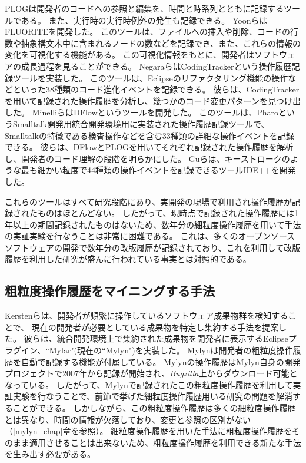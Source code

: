 \documentclass[a4paper]{jsbook}
\begin{document}
PLOG\cite{plog}は開発者のコードへの参照と編集を、時間と時系列とともに記録するツールである。
また、実行時の実行時例外の発生も記録できる。
YoonらはFLUORITE\cite{yoon:2011}を開発した。
このツールは、ファイルへの挿入や削除、コードの行数や抽象構文木中に含まれるノードの数などを記録でき、また、これらの情報の変化を可視化する機能がある。
この可視化情報をもとに、開発者はソフトウェアの成長過程を見ることができる。
NegaraらはCodingTracker\cite{Negara:2012}という操作履歴記録ツールを実装した。
このツールは、Eclipseのリファクタリング機能の操作などといった38種類のコード進化イベントを記録できる。
彼らは、CodingTrackerを用いて記録された操作履歴を分析し、幾つかのコード変更パターンを見つけ出した\cite{Negara:2014}。
Minelliらは{\sc DFlow}というツールを開発した。
このツールは、PharoというSmalltalk開発用統合開発環境用に実装された操作履歴記録ツールで、Smalltalkの特徴である検査操作などを含む33種類の詳細な操作イベントを記録できる。
彼らは、{\sc DFlow}とPLOGを用いてそれぞれ記録された操作履歴を解析し、開発者のコード理解の段階を明らかにした。
Guらは、キーストロークのような最も細かい粒度で44種類の操作イベントを記録できるツールIDE++\cite{Gu:2014}を開発した。

これらのツールはすべて研究段階にあり、実開発の現場で利用され操作履歴が記録されたものはほとんどない。
したがって、現時点で記録された操作履歴には1年以上の期間記録されたものはないため、数年分の細粒度操作履歴を用いて手法の実証実験を行なうことは非常に困難である。
これは、多くのオープンソースソフトウェアの開発で数年分の改版履歴が記録されており、これを利用して改版履歴を利用した研究が盛んに行われている事実とは対照的である。
\subsection{粗粒度操作履歴をマイニングする手法}
Kerstenらは、開発者が頻繁に操作しているソフトウェア成果物群を検知することで、
現在の開発者が必要としている成果物を特定し集約する手法を提案した。
彼らは、統合開発環境上で集約された成果物を開発者に表示するEclipseプラグイン、``Mylar"(現在の``Mylyn")\cite{Kersten:2005}を実装した。
Mylynは開発者の粗粒度操作履歴を自動で記録する機能が付属している。
Mylynの操作履歴はMylyn自身の開発プロジェクトで2007年から記録が開始され、{\it Bugzilla}上からダウンロード可能となっている。
したがって、Mylynで記録されたこの粗粒度操作履歴を利用して実証実験を行なうことで、前節で挙げた細粒度操作履歴用いる研究の問題を解消することができる。
しかしながら、この粗粒度操作履歴は多くの細粒度操作履歴とは異なり、時間の情報が欠落しており、変更と参照の区別がない（\ref{mylyn_chap}章を参照）。
細粒度操作履歴を用いた手法に粗粒度操作履歴をそのまま適用させることは出来ないため、粗粒度操作履歴を利用できる新たな手法を生み出す必要がある。
\end{document}
